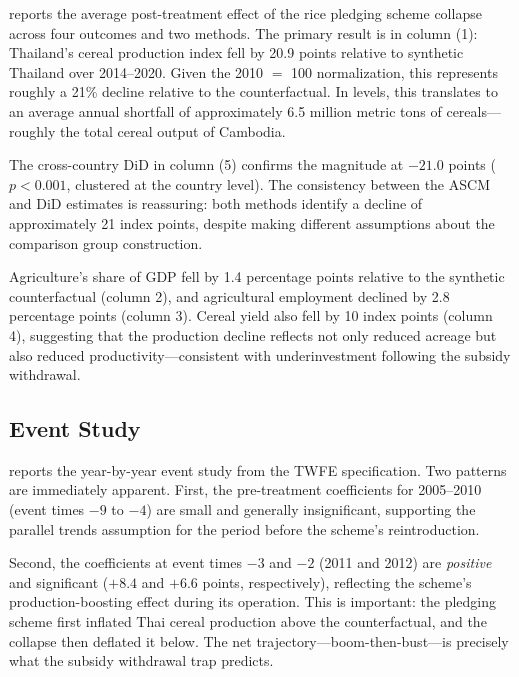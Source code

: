 \documentclass[12pt]{article}
\begin{document}
 reports the average post-treatment effect of the rice pledging scheme collapse across four outcomes and two methods. The primary result is in column (1): Thailand's cereal production index fell by 20.9 points relative to synthetic Thailand over 2014--2020. Given the 2010 $=$ 100 normalization, this represents roughly a 21\% decline relative to the counterfactual. In levels, this translates to an average annual shortfall of approximately 6.5 million metric tons of cereals---roughly the total cereal output of Cambodia.

The cross-country DiD in column (5) confirms the magnitude at $-21.0$ points ($p < 0.001$, clustered at the country level). The consistency between the ASCM and DiD estimates is reassuring: both methods identify a decline of approximately 21 index points, despite making different assumptions about the comparison group construction.



Agriculture's share of GDP fell by 1.4 percentage points relative to the synthetic counterfactual (column 2), and agricultural employment declined by 2.8 percentage points (column 3). Cereal yield also fell by 10 index points (column 4), suggesting that the production decline reflects not only reduced acreage but also reduced productivity---consistent with underinvestment following the subsidy withdrawal.

\subsection{Event Study}

 reports the year-by-year event study from the TWFE specification. Two patterns are immediately apparent. First, the pre-treatment coefficients for 2005--2010 (event times $-9$ to $-4$) are small and generally insignificant, supporting the parallel trends assumption for the period before the scheme's reintroduction.



Second, the coefficients at event times $-3$ and $-2$ (2011 and 2012) are \textit{positive} and significant ($+8.4$ and $+6.6$ points, respectively), reflecting the scheme's production-boosting effect during its operation. This is important: the pledging scheme first inflated Thai cereal production above the counterfactual, and the collapse then deflated it below. The net trajectory---boom-then-bust---is precisely what the subsidy withdrawal trap predicts.
\end{document}
